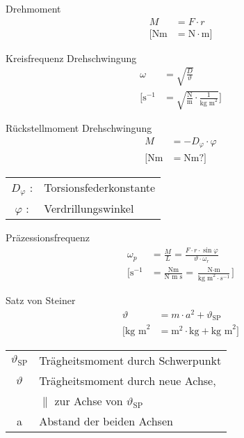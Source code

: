 \begin{karte}{Drehmoment}
    \begin{align*}
        M &= F \cdot r \\
        \bigg[ \text{Nm} &=
            \text{N} \cdot \text{m}
            \bigg]
    \end{align*}
\end{karte}

\begin{karte}{Kreisfrequenz Drehschwingung}
    \begin{align*}
        \omega &= \sqrt{\frac{D}{\vartheta}} \\
        \bigg[ \text{s}^{-1} &=  \sqrt{ \frac{\text{N}}{\text{m}} \cdot \frac{1}{\text{kg m}^2 }}
            \bigg]
    \end{align*}
\end{karte}

\begin{karte}{Rückstellmoment Drehschwingung}
    \begin{align*}
        M &= -D_\varphi \cdot \varphi \\
        [ \text{Nm} &= \text{Nm?} ]
    \end{align*}
    \begin{tabular}[t]{cl}
        \(D_\varphi\) :& Torsionsfederkonstante \\
        \(\varphi\) :& Verdrillungswinkel
    \end{tabular}
\end{karte}

\begin{karte}{Präzessionsfrequenz}
     \begin{align*}
         \omega_p &= \frac{M}{L} = \frac{ F \cdot r \cdot \sin \varphi }{ \vartheta \cdot \omega_r} \\
         \bigg[ \text{s}^{-1} &= \frac{\text{Nm}}{\text{N m s}} 
             = \frac{\text{N} \cdot \text{m}}{\text{kg m}^2 \cdot s^{-1}}
            \bigg]
     \end{align*}
\end{karte}

\begin{karte}{Satz von Steiner}
    \begin{align*}
        \vartheta &= m \cdot a^2 + \vartheta_{\text{SP}} \\
        \bigg[ \text{kg m}^2 &=
            \text{m}^2 \cdot \text{kg} + \text{kg m}^2
            \bigg]
    \end{align*}
    \begin{tabular}[t]{cl}
        \(\vartheta_\text{SP}\) & Trägheitsmoment durch Schwerpunkt \\
        \(\vartheta\) & Trägheitsmoment durch neue Achse, \\
        &\(\parallel\) zur Achse von \(\vartheta_\text{SP}\) \\
        a & Abstand der beiden Achsen
    \end{tabular}
\end{karte}

